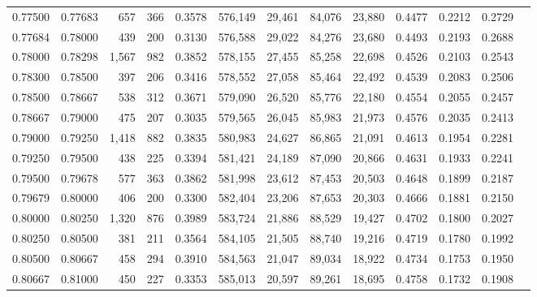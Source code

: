 \begin{tabular}{rrrrrrrrrrrrr}
0.77500 & 0.77683 &   657 & 366 &                                     0.3578 & 576,149 &  29,461 &  84,076 &  23,880 & 0.4477 & 0.2212 & 0.2729 \\
0.77684 & 0.78000 &   439 & 200 &                                     0.3130 & 576,588 &  29,022 &  84,276 &  23,680 & 0.4493 & 0.2193 & 0.2688 \\
0.78000 & 0.78298 & 1,567 & 982 &                                     0.3852 & 578,155 &  27,455 &  85,258 &  22,698 & 0.4526 & 0.2103 & 0.2543 \\
0.78300 & 0.78500 &   397 & 206 &                                     0.3416 & 578,552 &  27,058 &  85,464 &  22,492 & 0.4539 & 0.2083 & 0.2506 \\
0.78500 & 0.78667 &   538 & 312 &                                     0.3671 & 579,090 &  26,520 &  85,776 &  22,180 & 0.4554 & 0.2055 & 0.2457 \\
0.78667 & 0.79000 &   475 & 207 &                                     0.3035 & 579,565 &  26,045 &  85,983 &  21,973 & 0.4576 & 0.2035 & 0.2413 \\
0.79000 & 0.79250 & 1,418 & 882 &                                     0.3835 & 580,983 &  24,627 &  86,865 &  21,091 & 0.4613 & 0.1954 & 0.2281 \\
0.79250 & 0.79500 &   438 & 225 &                                     0.3394 & 581,421 &  24,189 &  87,090 &  20,866 & 0.4631 & 0.1933 & 0.2241 \\
0.79500 & 0.79678 &   577 & 363 &                                     0.3862 & 581,998 &  23,612 &  87,453 &  20,503 & 0.4648 & 0.1899 & 0.2187 \\
0.79679 & 0.80000 &   406 & 200 &                                     0.3300 & 582,404 &  23,206 &  87,653 &  20,303 & 0.4666 & 0.1881 & 0.2150 \\
0.80000 & 0.80250 & 1,320 & 876 &                                     0.3989 & 583,724 &  21,886 &  88,529 &  19,427 & 0.4702 & 0.1800 & 0.2027 \\
0.80250 & 0.80500 &   381 & 211 &                                     0.3564 & 584,105 &  21,505 &  88,740 &  19,216 & 0.4719 & 0.1780 & 0.1992 \\
0.80500 & 0.80667 &   458 & 294 &                                     0.3910 & 584,563 &  21,047 &  89,034 &  18,922 & 0.4734 & 0.1753 & 0.1950 \\
0.80667 & 0.81000 &   450 & 227 &                                     0.3353 & 585,013 &  20,597 &  89,261 &  18,695 & 0.4758 & 0.1732 & 0.1908 \\

\end{tabular}

